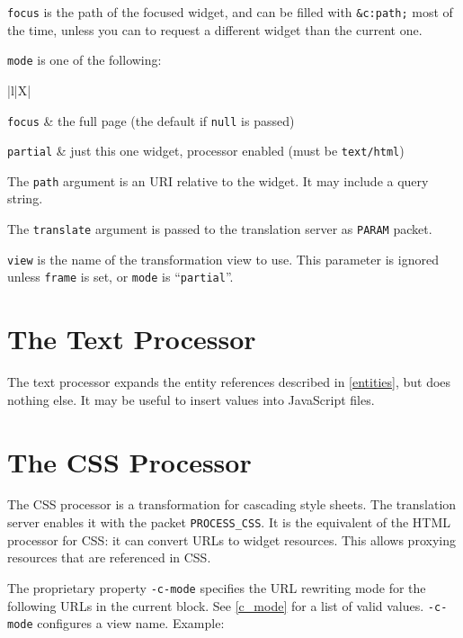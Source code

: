 \documentclass[a4paper,12pt]{article}
\begin{document}
\texttt{focus} is the path of the focused widget, and can be filled
with \texttt{\&c:path;} most of the time, unless you can to request a
different widget than the current one.

\texttt{mode} is one of the following:

\begin{longtabu*}{|l|X|}
\hline

\texttt{focus} & the full page (the default if \texttt{null} is
passed) \\

\hline

\texttt{partial} & just this one widget, processor enabled (must be
\texttt{text/html}) \\

\hline
\end{longtabu*}

The \texttt{path} argument is an URI relative to the widget.  It may
include a query string.

The \texttt{translate} argument is passed to the translation server as
\texttt{PARAM} packet.

\texttt{view} is the name of the transformation view to use.  This
parameter is ignored unless \texttt{frame} is set, or \texttt{mode} is
``\texttt{partial}''.


\section{The Text Processor}
\label{textprocessor}

The text processor expands the entity references described in
\ref{entities}, but does nothing else.  It may be useful to insert
values into JavaScript files.


\section{The CSS Processor}
\label{cssprocessor}

The CSS processor is a transformation for cascading style sheets.  The
translation server enables it with the packet \verb|PROCESS_CSS|.
It is the equivalent of the HTML processor for CSS: it can convert
URLs to widget resources.  This allows proxying resources that are
referenced in CSS.

The proprietary property \texttt{-c-mode} specifies the URL rewriting
mode for the following URLs in the current block.  See \ref{c_mode}
for a list of valid values.  \texttt{-c-mode} configures a view name.
Example:
\end{document}
